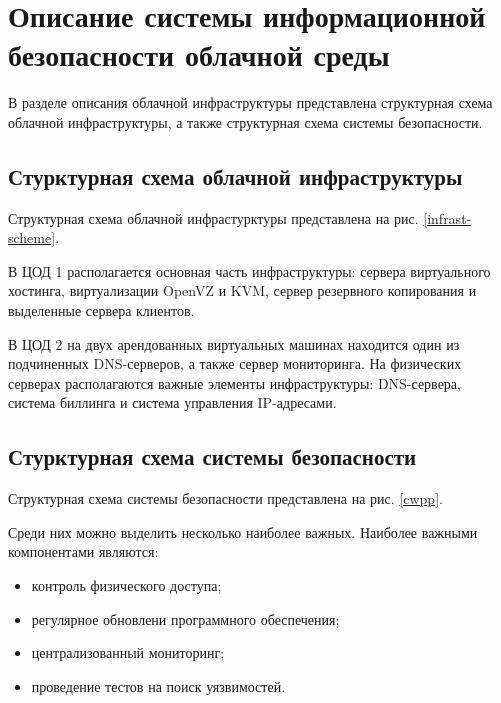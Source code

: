 \section{Описание системы информационной безопасности облачной среды}

В разделе описания облачной инфраструктуры представлена структурная схема облачной инфраструктуры, а также структурная схема системы безопасности.

\subsection{Стурктурная схема облачной инфраструктуры}

Структурная схема облачной инфрастурктуры представлена на рис. \ref{infrast-scheme}.


В ЦОД 1 располагается основная часть инфраструктуры: сервера виртуального хостинга, виртуализации OpenVZ и KVM, сервер резервного копирования и выделенные сервера клиентов.

В ЦОД 2 на двух арендованных виртуальных машинах находится один из подчиненных DNS-серверов, а также сервер мониторинга.
На физических серверах располагаются важные элементы инфраструктуры: DNS-сервера, система биллинга и система управления IP-адресами.

\subsection{Стурктурная схема системы безопасности}

Структурная схема системы безопасности представлена на рис. \ref{cwpp}.


Среди них можно выделить несколько наиболее важных.
Наиболее важными компонентами являются:
\begin{itemize}
  \item контроль физического доступа;
  \item регулярное обновлени программного обеспечения;
  \item централизованный мониторинг;
  \item проведение тестов на поиск уязвимостей.
\end{itemize}

\clearpage